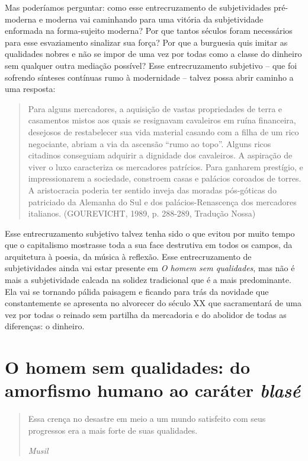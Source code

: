 Mas poderíamos perguntar: como esse entrecruzamento de subjetividades
pré-moderna e moderna vai caminhando para uma vitória da subjetividade
enformada na forma-sujeito moderna? Por que tantos séculos foram
necessários para esse esvaziamento sinalizar sua força? Por que a
burguesia quis imitar as qualidades nobres e não se impor de uma vez por
todas como a classe do dinheiro sem qualquer outra mediação possível?
Esse entrecruzamento subjetivo -- que foi sofrendo sínteses contínuas
rumo à modernidade -- talvez possa abrir caminho a uma resposta:

\begin{quote}
Para alguns mercadores, a aquisição de vastas propriedades de terra e
casamentos mistos aos quais se resignavam cavaleiros em ruína
financeira, desejosos de restabelecer sua vida material casando com a
filha de um rico negociante, abriam a via da ascensão ``rumo ao topo''.
Alguns ricos citadinos conseguiam adquirir a dignidade dos cavaleiros. A
aspiração de viver o luxo caracteriza os mercadores patrícios. Para
ganharem prestígio, e impressionarem a sociedade, constroem casas e
palácios coroados de torres. A aristocracia poderia ter sentido inveja
das moradas pós-góticas do patriciado da Alemanha do Sul e dos
palácios-Renascença dos mercadores italianos. (GOUREVICHT, 1989, p.
288-289, Tradução Nossa)
\end{quote}

Esse entrecruzamento subjetivo talvez tenha sido o que evitou por muito
tempo que o capitalismo mostrasse toda a sua face destrutiva em todos os
campos, da arquitetura à poesia, da música à reflexão. Esse
entrecruzamento de subjetividades ainda vai estar presente em \emph{O
homem sem qualidades}, mas não é mais a subjetividade calcada na solidez
tradicional que é a mais predominante. Ela vai se tornando pálida
paisagem e ficando para trás da novidade que constantemente se apresenta
no alvorecer do século XX que sacramentará de uma vez por todas o
reinado sem partilha da mercadoria e do abolidor de todas as diferenças:
o dinheiro.

\chapter{O homem sem qualidades: do amorfismo humano ao caráter \emph{blasé}}

\begin{quote}
Essa crença no desastre em meio a um mundo satisfeito com seus
progressos era a mais forte de suas qualidades.

\emph{Musil}
\end{quote}

